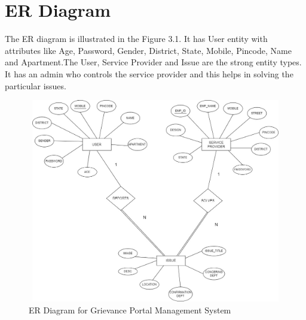 \documentclass[12pt,a4paper]{report}
\begin{document}
\section{ER Diagram}
The ER diagram is illustrated in the Figure 3.1.  It has User entity with attributes like Age, Password, Gender, District, State, Mobile, Pincode, Name and Apartment.The User, Service Provider and Issue are the strong entity types. It has an admin who controls the service provider and this helps in solving the particular issues.\\
\begin{figure}[hbtp]
\centering
\includegraphics[width=6in,height=3.5in]{ER.jpg}
\caption{ER Diagram for Grievance Portal Management System}
\end{figure}
\newpage
\end{document}
